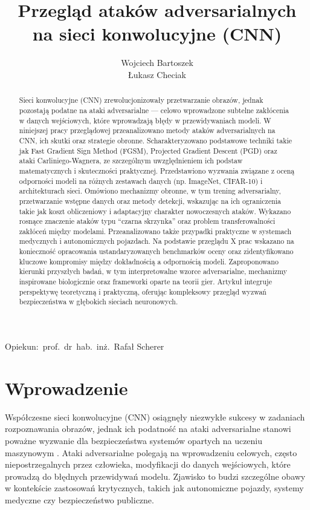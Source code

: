 \documentclass[12pt]{article}
\title{Przegląd ataków adversarialnych na sieci konwolucyjne (CNN)}
\author{
    Wojciech Bartoszek \\
    Łukasz Checiak
}
\date{}
\begin{document}
\maketitle

\begin{center}
    Opiekun:\ prof.\ dr\ hab.\ inż.\ Rafał Scherer
\end{center}

\begin{abstract}
    Sieci konwolucyjne (CNN) zrewolucjonizowały przetwarzanie obrazów, jednak pozostają podatne na ataki adversarialne --- celowo wprowadzone subtelne zakłócenia w danych wejściowych, które wprowadzają błędy w przewidywaniach modeli. W niniejszej pracy przeglądowej przeanalizowano metody ataków adversarialnych na CNN, ich skutki oraz strategie obronne. Scharakteryzowano podstawowe techniki takie jak Fast Gradient Sign Method (FGSM), Projected Gradient Descent (PGD) oraz ataki Carliniego-Wagnera, ze szczególnym uwzględnieniem ich podstaw matematycznych i skuteczności praktycznej. Przedstawiono wyzwania związane z oceną odporności modeli na różnych zestawach danych (np. ImageNet, CIFAR-10) i architekturach sieci. Omówiono mechanizmy obronne, w tym trening adversarialny, przetwarzanie wstępne danych oraz metody detekcji, wskazując na ich ograniczenia takie jak koszt obliczeniowy i adaptacyjny charakter nowoczesnych ataków. Wykazano rosnące znaczenie ataków typu ``czarna skrzynka'' oraz problem transferowalności zakłóceń między modelami. Przeanalizowano także przypadki praktyczne w systemach medycznych i autonomicznych pojazdach. Na podstawie przeglądu X prac wskazano na konieczność opracowania ustandaryzowanych benchmarków oceny oraz zidentyfikowano kluczowe kompromisy między dokładnością a odpornością modeli. Zaproponowano kierunki przyszłych badań, w tym interpretowalne wzorce adversarialne, mechanizmy inspirowane biologicznie oraz frameworki oparte na teorii gier. Artykuł integruje perspektywę teoretyczną i praktyczną, oferując kompleksowy przegląd wyzwań bezpieczeństwa w głębokich sieciach neuronowych.
\end{abstract}


\section{Wprowadzenie}

Współczesne sieci konwolucyjne (CNN) osiągnęły niezwykłe sukcesy w zadaniach rozpoznawania obrazów, jednak ich podatność na ataki adversarialne stanowi poważne wyzwanie dla bezpieczeństwa systemów opartych na uczeniu maszynowym \cite{szegedy2013intriguing}. Ataki adversarialne polegają na wprowadzeniu celowych, często niepostrzegalnych przez człowieka, modyfikacji do danych wejściowych, które prowadzą do błędnych przewidywań modelu. Zjawisko to budzi szczególne obawy w kontekście zastosowań krytycznych, takich jak autonomiczne pojazdy, systemy medyczne czy bezpieczeństwo publiczne.
\end{document}
